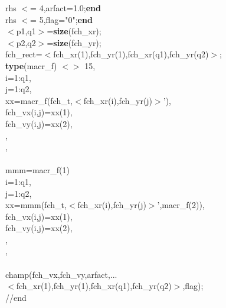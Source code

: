 {\begin{flushleft}
{ rhs $<$= 4,arfact=1.0;{\bf end}\\ 
 rhs $<$= 5,flag="0";{\bf end} \\ 
\cmarg $<$p1,q1$>$={\bf size}(fch\_xr);\\ 
\cmarg $<$p2,q2$>$={\bf size}(fch\_yr);\\ 
\cmarg fch\_rect=$<$fch\_xr(1),fch\_yr(1),fch\_xr(q1),fch\_yr(q2)$>$;\\ 
 {\bf type}(macr\_f) $<$$>$ 15,\\ 
\cmarg \hspace{0.5cm}{\bf for} i=1:q1,\\ 
\cmarg \hspace{1.0cm}{\bf for} j=1:q2,\\ 
\cmarg \hspace{1.5cm}xx=macr\_f(fch\_t,$<$fch\_xr(i),fch\_yr(j)$>$'),\\ 
\cmarg \hspace{1.5cm}fch\_vx(i,j)=xx(1),\\ 
\cmarg \hspace{1.5cm}fch\_vy(i,j)=xx(2),\\ 
\cmarg \hspace{0.8cm}{\bf end},\\ 
\cmarg \hspace{0.5cm}{\bf end},\\ 
\\ 
\cmarg \hspace{0.5cm}mmm=macr\_f(1) \\ 
\cmarg \hspace{0.5cm}{\bf for} i=1:q1,\\ 
\cmarg \hspace{1.0cm}{\bf for} j=1:q2,\\ 
\cmarg \hspace{1.5cm}xx=mmm(fch\_t,$<$fch\_xr(i),fch\_yr(j)$>$',macr\_f(2)),\\ 
\cmarg \hspace{1.5cm}fch\_vx(i,j)=xx(1),\\ 
\cmarg \hspace{1.5cm}fch\_vy(i,j)=xx(2),\\ 
\cmarg \hspace{0.8cm}{\bf end},\\ 
\cmarg \hspace{0.5cm}{\bf end},\\ 
\\ 
\cmarg champ(fch\_vx,fch\_vy,arfact,...\\ 
\cmarg \hspace{0.8cm}$<$fch\_xr(1),fch\_yr(1),fch\_xr(q1),fch\_yr(q2)$>$,flag);\\ 
\cmarg //end}
\end{flushleft}}



